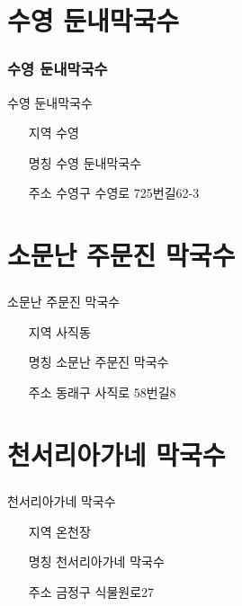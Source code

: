 \documentclass[aspectratio=1610,17pt,xcolor=pdftex,dvipsnames,table,handout]{beamer}
\begin{document}
		\section{ 수영 둔내막국수	}
		\begin{frame} [t,plain]
		\frametitle{ 수영 둔내막국수	}
			\begin{block} { 수영 둔내막국수	}
			\setlength{\leftmargini}{4em}			
			\begin{itemize}
				\item [지역] 수영	
				\item [명칭] 수영 둔내막국수	
				\item [주소] 수영구 수영로 725번길62-3
			\end{itemize}
			\end{block}						
		\end{frame}						

		\section{ 소문난 주문진 막국수	}
		\begin{frame} [t,plain]
		\frametitle{ }
			\begin{block} {소문난 주문진 막국수	}
			\setlength{\leftmargini}{4em}			
			\begin{itemize}
				\item [지역] 사직동	
				\item [명칭] 소문난 주문진 막국수	
				\item [주소] 동래구 사직로 58번길8
			\end{itemize}
			\end{block}						
		\end{frame}						


		\section{ 천서리아가네 막국수	}
		\begin{frame} [t,plain]
		\frametitle{ }
			\begin{block} {천서리아가네 막국수	}
			\setlength{\leftmargini}{4em}			
			\begin{itemize}
				\item [지역] 온천장	
				\item [명칭] 천서리아가네 막국수	
				\item [주소] 금정구 식물원로27
			\end{itemize}
			\end{block}						
		\end{frame}						
\end{document}
